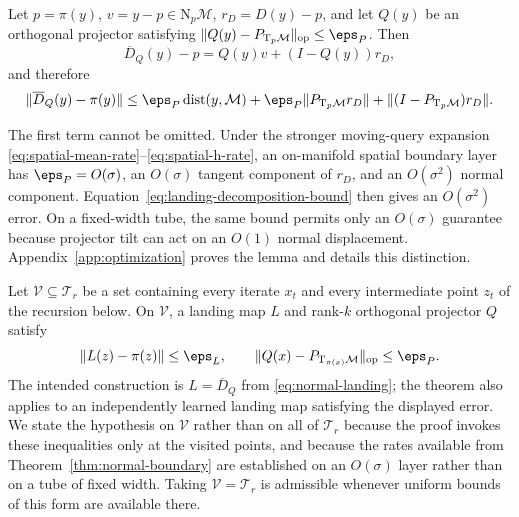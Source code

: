 \documentclass[10pt]{article}
\theoremstyle{c2fup}
\newcommand{\M}{\mathcal{M}}
\newcommand{\T}{\mathrm{T}}
\newcommand{\N}{\mathrm{N}}
\newcommand{\op}{\mathrm{op}}
\newcommand{\dist}{\operatorname{dist}}
\begin{document}
\begin{lemma}
\label{lem:landing-decomposition}
Let $p=\pi(y)$, $v=y-p\in\N_p\M$, $r_D=D(y)-p$, and let $Q(y)$ be an orthogonal projector satisfying
$\|Q(y)-P_{\T_p\M}\|_\op\le\eps_P$.  Then
\begin{equation}
  \overline D_Q(y)-p=Q(y)v+(I-Q(y))r_D,
  \label{eq:landing-decomposition}
\end{equation}
and therefore
\begin{equation}
  \|\overline D_Q(y)-\pi(y)\|
  \le \eps_P\dist(y,\M)
  +\eps_P\|P_{\T_p\M}r_D\|
  +\|(I-P_{\T_p\M})r_D\|.
  \label{eq:landing-decomposition-bound}
\end{equation}
\end{lemma}

The first term cannot be omitted.  Under the stronger moving-query expansion \eqref{eq:spatial-mean-rate}--\eqref{eq:spatial-h-rate}, an on-manifold spatial boundary layer has $\eps_P=O(\sigma)$, an $O(\sigma)$ tangent component of $r_D$, and an $O(\sigma^2)$ normal component.  Equation~\eqref{eq:landing-decomposition-bound} then gives an $O(\sigma^2)$ error.  On a fixed-width tube, the same bound permits only an $O(\sigma)$ guarantee because projector tilt can act on an $O(1)$ normal displacement.  Appendix~\ref{app:optimization} proves the lemma and details this distinction.

\begin{assumption}
\label{ass:oracles}
Let $\mathcal V\subseteq\mathcal{T}_r$ be a set containing every iterate $x_t$ and every intermediate point $z_t$ of the recursion below.  On $\mathcal V$, a landing map $L$ and rank-$k$ orthogonal projector $Q$ satisfy
\begin{equation}
  \|L(z)-\pi(z)\|\le\eps_L,
  \qquad
  \|Q(x)-P_{\T_{\pi(x)}\M}\|_\op\le\eps_P.
  \label{eq:oracle-errors}
\end{equation}
The intended construction is $L=\overline D_Q$ from \eqref{eq:normal-landing}; the theorem also applies to an independently learned landing map satisfying the displayed error.  We state the hypothesis on $\mathcal V$ rather than on all of $\mathcal T_r$ because the proof invokes these inequalities only at the visited points, and because the rates available from Theorem~\ref{thm:normal-boundary} are established on an $O(\sigma)$ layer rather than on a tube of fixed width.  Taking $\mathcal V=\mathcal T_r$ is admissible whenever uniform bounds of this form are available there.
\end{assumption}
\end{document}
